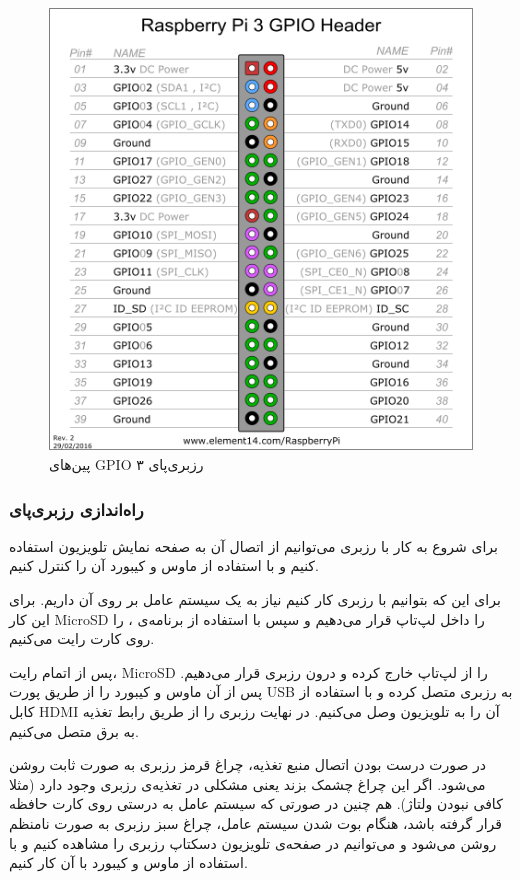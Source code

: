 \documentclass[12pt]{article}
\begin{document}
\begin{figure}[h]
	\begin{center}
		\includegraphics[width=.70\textwidth]{pi3_5F00_gpio} %
	\end{center}
	\caption{پین‌های GPIO رزبری‌پای ۳ \cite{3}}
\end{figure}



\subsubsection{‌راه‌اندازی رزبری‌پای}

برای شروع به کار با رزبری می‌توانیم از اتصال آن به صفحه نمایش تلویزیون استفاده کنیم و با استفاده از ماوس و کیبورد آن را کنترل کنیم.

برای این که بتوانیم با رزبری کار کنیم نیاز به یک سیستم عامل بر روی آن داریم. برای این کار MicroSD را داخل لپ‌تاپ قرار می‌دهیم و سپس با استفاده از برنامه‌ی ،  را روی کارت رایت می‌کنیم.

پس از اتمام رایت، MicroSD را از لپ‌تاپ خارج کرده و درون رزبری قرار می‌دهیم. پس از آن ماوس و کیبورد را از طریق پورت USB به رزبری متصل کرده و با استفاده از کابل HDMI آن را به تلویزیون وصل می‌کنیم. در نهایت رزبری را از طریق رابط تغذیه به برق متصل می‌کنیم.

در صورت درست بودن اتصال منبع تغذیه، چراغ قرمز رزبری به صورت ثابت روشن می‌شود. اگر این چراغ چشمک بزند یعنی مشکلی در تغذیه‌ی رزبری وجود دارد (مثلا کافی نبودن ولتاژ). هم چنین در صورتی که سیستم عامل به درستی روی کارت حافظه قرار گرفته باشد، هنگام بوت شدن سیستم عامل، چراغ سبز رزبری به صورت نامنظم روشن می‌شود و می‌توانیم در صفحه‌ی تلویزیون دسکتاپ رزبری را مشاهده کنیم و با استفاده از ماوس و کیبورد با آن کار کنیم.
\end{document}
